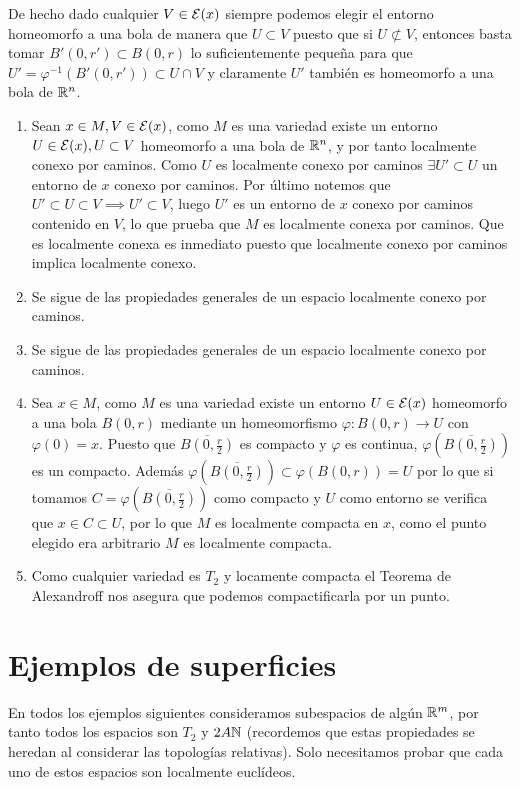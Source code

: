 {  De hecho dado cualquier $V\in\mathcal{E}(x)$ siempre podemos elegir el entorno homeomorfo a una bola de manera que $U\subset V$ puesto que si $U\not\subset V$, entonces basta tomar $B'(0,r')\subset B(0,r)$ lo suficientemente pequeña para que $U'=\varphi^{-1}(B'(0,r'))\subset U\cap V$ y claramente $U'$ también es homeomorfo a una bola de $\mathbb{R}^n$.
    \begin{enumerate}
      \item Sean $x\in M, V\in\mathcal{E}(x)$, como $M$ es una variedad existe un entorno $U\in\mathcal{E}(x),U\subset V$ homeomorfo a una bola de $\mathbb{R}^n$, y por tanto localmente conexo por caminos. Como $U$ es localmente conexo por caminos $\exists U'\subset U$ un entorno de $x$ conexo por caminos. Por último notemos que $U'\subset U\subset V\implies U'\subset V$, luego $U'$ es un entorno de $x$ conexo por caminos contenido en $V$, lo que prueba que $M$ es localmente conexa por caminos. Que es localmente conexa es inmediato puesto que localmente conexo por caminos implica localmente conexo. 
      \item Se sigue de las propiedades generales de un espacio localmente conexo por caminos.
      \item Se sigue de las propiedades generales de un espacio localmente conexo por caminos.
      \item Sea $x\in M$, como $M$ es una variedad existe un entorno $U\in\mathcal{E}(x)$ homeomorfo a una bola $B(0,r)$ mediante un homeomorfismo $\varphi : B(0,r)\rightarrow U $ con $\varphi(0) = x$. Puesto que $\overline{B(0,\frac{r}{2})}$ es compacto y $\varphi$ es continua, $\varphi(\overline{B(0,\frac{r}{2})})$ es un compacto. Además $\varphi(\overline{B(0,\frac{r}{2})})\subset\varphi(B(0,r))=U$ por lo que si tomamos $C=\varphi(\overline{B(0,\frac{r}{2})})$ como compacto y $U$ como entorno se verifica que $x\in C\subset U$, por lo que $M$ es localmente compacta en $x$, como el punto elegido era arbitrario $M$ es localmente compacta.
      \item Como cualquier variedad es $T_2$ y locamente compacta el Teorema de Alexandroff nos asegura que podemos compactificarla por un punto.
    \end{enumerate}
}

\clearpage

\section{Ejemplos de superficies}

En todos los ejemplos siguientes consideramos subespacios de algún $\mathbb{R}^m$, por tanto todos los espacios son $T_2$ y $2A\mathbb{N}$ (recordemos que estas propiedades se heredan al considerar las topologías relativas). Solo necesitamos probar que cada uno de estos espacios son localmente euclídeos.

